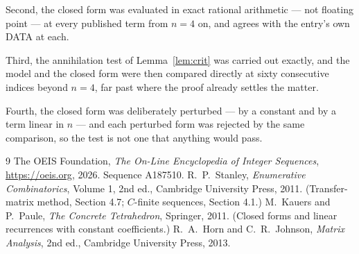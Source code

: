 \documentclass[11pt,a4paper]{article}
\theoremstyle{plain}
\theoremstyle{definition}
\begin{document}
Second, the closed form was evaluated in exact rational arithmetic --- not floating point ---
at every published term from $n=4$ on, and agrees with the entry's own DATA at each.

Third, the annihilation test of Lemma~\ref{lem:crit} was carried out exactly, and the model
and the closed form were then compared directly at sixty consecutive indices beyond
$n=4$, far past where the proof already settles the matter.

Fourth, the closed form was deliberately perturbed --- by a constant and by a term linear in
$n$ --- and each perturbed form was rejected by the same comparison, so the test is not one
that anything would pass.

\begin{thebibliography}{9}
 The OEIS Foundation, \emph{The On-Line Encyclopedia of Integer
Sequences}, \url{https://oeis.org}, 2026. Sequence A187510.
 R.~P.~Stanley, \emph{Enumerative Combinatorics}, Volume 1, 2nd ed.,
Cambridge University Press, 2011. (Transfer-matrix method, Section 4.7; $C$-finite sequences,
Section 4.1.)
 M.~Kauers and P.~Paule, \emph{The Concrete Tetrahedron}, Springer, 2011.
(Closed forms and linear recurrences with constant coefficients.)
 R.~A.~Horn and C.~R.~Johnson, \emph{Matrix Analysis}, 2nd ed., Cambridge
University Press, 2013.
\end{thebibliography}
\end{document}
